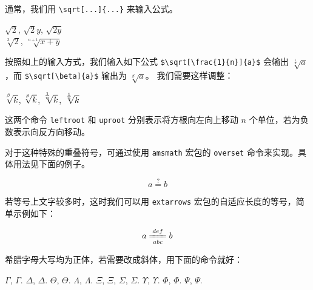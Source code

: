 通常，我们用 \verb|\sqrt[...]{...}| 来输入公式。
\begin{example}
$\sqrt2$, $\sqrt2y$, $\sqrt{2y}$\\
$\sqrt[3]{2}$, $\sqrt[n+1]{x+y}$
\end{example}

按照如上的输入方式，我们输入如下公式 \verb|$\sqrt[\frac{1}{n}]{a}$| 会输出 $\sqrt[\frac{1}{n}]{a}$ ，而 \verb|$\sqrt[\beta]{a}$| 输出为 $\sqrt[\beta]{a}$。
我们需要这样调整：
\begin{example}
$\sqrt[\leftroot{2}\uproot{4}\beta]{k}$,
$\sqrt[\leftroot{1}\uproot{3}\beta]{k}$,
$\sqrt[\leftroot{2}\uproot{4}\frac{1}{n}]{k}$,
$\sqrt[\leftroot{1}\uproot{3}\frac{1}{n}]{k}$
\end{example}
\noindent 这两个命令 \verb|leftroot| 和 \verb|uproot| 分别表示将方根向左向上移动 $n$ 个单位，若为负数表示向反方向移动。



对于这种特殊的重叠符号，可通过使用 \verb|amsmath| 宏包的 \verb|overset|
命令来实现。具体用法见下面的例子。
\begin{example}
\begin{equation}a\overset{?}{=}b\end{equation}
\end{example}

若等号上文字较多时，这时我们可以用 \verb|extarrows| 宏包的自适应长度的等号，简单示例如下：
\begin{example}
\begin{equation}
  a\xlongequal[abc]{def}b
\end{equation}
\end{example}

希腊字母大写均为正体，若需要改成斜体，用下面的命令就好：
\begin{example}
$\Gamma$, $\varGamma$. $\Delta$, $\varDelta$.
$\Theta$, $\varTheta$. $\Lambda$, $\varLambda$.
$\Xi$, $\varXi$, $\Sigma$,  $\varSigma$.
$\Upsilon$, $\varUpsilon$. $\Phi$, $\varPhi$.
$\Psi$, $\varPsi$.
\end{example}



